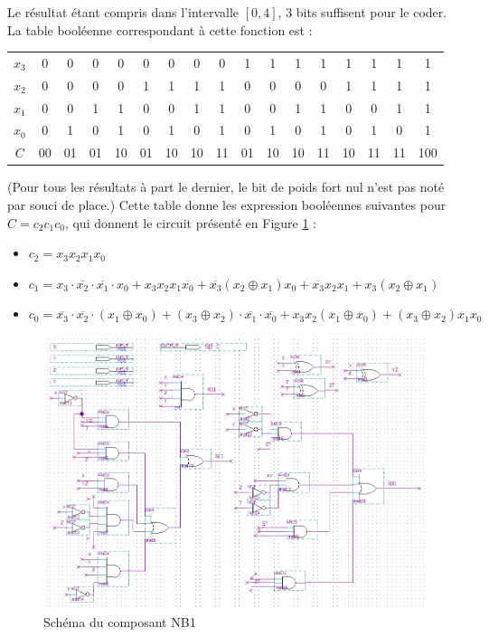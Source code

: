 \documentclass[a4paper,11pt]{article}
\begin{document}
Le résultat étant compris dans l'intervalle $[0, 4]$, 3 bits suffisent pour le coder. La table booléenne correspondant à cette fonction est :
\begin{table}[h]\centering
\begin{tabular}[center]{c|c|c|c|c|c|c|c|c|c|c|c|c|c|c|c|c}
$x_3$&0&0&0&0&0&0&0&0&1&1&1&1&1&1&1&1 \\
$x_2$&0&0&0&0&1&1&1&1&0&0&0&0&1&1&1&1 \\
$x_1$&0&0&1&1&0&0&1&1&0&0&1&1&0&0&1&1 \\
$x_0$&0&1&0&1&0&1&0&1&0&1&0&1&0&1&0&1 \\ \hline
$C$&00&01&01&10&01&10&10&11&01&10&10&11&10&11&11&100
\end{tabular}\end{table}

(Pour tous les résultats à part le dernier, le bit de poids fort nul n'est pas noté par souci de place.) Cette table donne les expression booléennes suivantes pour $C = c_2c_1c_0$, qui donnent le circuit présenté en Figure \ref{nb1} :
\begin{itemize}
  \item $c_2=x_3x_2x_1x_0$
  \item $c_1=x_3\cdot\overline{x_2}\cdot\overline{x_1}\cdot x_0 + x_3x_2x_1\overline{x_0} + \overline{x_3}(x_2\oplus x_1)x_0 + \overline{x_3}x_2x_1 + x_3(x_2\oplus x_1)$
  \item $c_0=\overline{x_3}\cdot\overline{x_2}\cdot(x_1\oplus x_0) + (x_3\oplus x_2)\cdot\overline{x_1}\cdot\overline{x_0} + x_3x_2(x_1\oplus x_0) + (x_3\oplus x_2)x_1x_0$
\end{itemize}

\begin{figure}[h]
\center
\includegraphics[scale=0.6]{nb1.PNG}
\caption{Schéma du composant NB1}
\label{nb1}
\end{figure}
\end{document}
